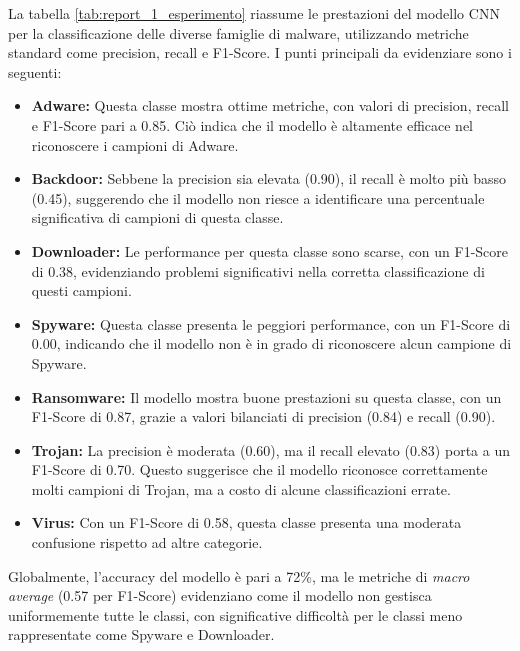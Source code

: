 La tabella \ref{tab:report_1_esperimento} riassume le prestazioni del modello CNN per la classificazione delle diverse famiglie di malware, utilizzando metriche standard come precision, recall e F1-Score. I punti principali da evidenziare sono i seguenti:
\begin{itemize}
    \item \textbf{Adware:} Questa classe mostra ottime metriche, con valori di precision, recall e F1-Score pari a 0.85. Ciò indica che il modello è altamente efficace nel riconoscere i campioni di Adware.
    \item \textbf{Backdoor:} Sebbene la precision sia elevata (0.90), il recall è molto più basso (0.45), suggerendo che il modello non riesce a identificare una percentuale significativa di campioni di questa classe.
    \item \textbf{Downloader:} Le performance per questa classe sono scarse, con un F1-Score di 0.38, evidenziando problemi significativi nella corretta classificazione di questi campioni.
    \item \textbf{Spyware:} Questa classe presenta le peggiori performance, con un F1-Score di 0.00, indicando che il modello non è in grado di riconoscere alcun campione di Spyware.
    \item \textbf{Ransomware:} Il modello mostra buone prestazioni su questa classe, con un F1-Score di 0.87, grazie a valori bilanciati di precision (0.84) e recall (0.90).
    \item \textbf{Trojan:} La precision è moderata (0.60), ma il recall elevato (0.83) porta a un F1-Score di 0.70. Questo suggerisce che il modello riconosce correttamente molti campioni di Trojan, ma a costo di alcune classificazioni errate.
    \item \textbf{Virus:} Con un F1-Score di 0.58, questa classe presenta una moderata confusione rispetto ad altre categorie.
\end{itemize}
Globalmente, l'accuracy del modello è pari a 72\%, ma le metriche di \textit{macro average} (0.57 per F1-Score) evidenziano come il modello non gestisca uniformemente tutte le classi, con significative difficoltà per le classi meno rappresentate come Spyware e Downloader.
